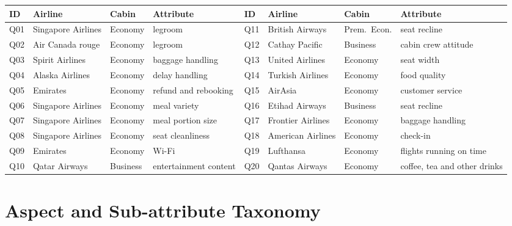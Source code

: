 \documentclass[10pt,twocolumn,a4paper]{article}
\begin{document}
\begin{center}\small\setlength{\tabcolsep}{4pt}
\begin{tabular}{@{}llll@{\hspace{6mm}}llll@{}}
\toprule
\textbf{ID} & \textbf{Airline} & \textbf{Cabin} & \textbf{Attribute} & \textbf{ID} & \textbf{Airline} & \textbf{Cabin} & \textbf{Attribute} \\
\midrule
Q01 & Singapore Airlines & Economy & legroom & Q11 & British Airways & Prem.\ Econ. & seat recline \\
Q02 & Air Canada rouge & Economy & legroom & Q12 & Cathay Pacific & Business & cabin crew attitude \\
Q03 & Spirit Airlines & Economy & baggage handling & Q13 & United Airlines & Economy & seat width \\
Q04 & Alaska Airlines & Economy & delay handling & Q14 & Turkish Airlines & Economy & food quality \\
Q05 & Emirates & Economy & refund and rebooking & Q15 & AirAsia & Economy & customer service \\
Q06 & Singapore Airlines & Economy & meal variety & Q16 & Etihad Airways & Business & seat recline \\
Q07 & Singapore Airlines & Economy & meal portion size & Q17 & Frontier Airlines & Economy & baggage handling \\
Q08 & Singapore Airlines & Economy & seat cleanliness & Q18 & American Airlines & Economy & check-in \\
Q09 & Emirates & Economy & Wi-Fi & Q19 & Lufthansa & Economy & flights running on time \\
Q10 & Qatar Airways & Business & entertainment content & Q20 & Qantas Airways & Economy & coffee, tea and other drinks \\
\bottomrule
\end{tabular}
\end{center}

\section{Aspect and Sub-attribute Taxonomy}
\label{app:taxonomy}
\end{document}

